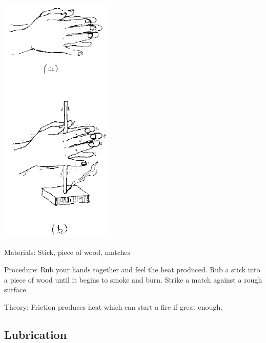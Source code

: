 \begin{multicols}{2}
\begin{center}
\includegraphics[width=0.4\textwidth]{./img/source/friction-heat.png}
\end{center}

\begin{description*}
\item[Materials:]{Stick, piece of wood, matches}
\item[Procedure:]{Rub your hands together and feel the heat produced. Rub a stick into a piece of wood until it begins to smoke and burn. Strike a match against a rough surface.}
\item[Theory:]{Friction produces heat which can start a fire if great enough.}
\end{description*}

\vfill
\columnbreak

\subsection{Lubrication}


\end{multicols}
